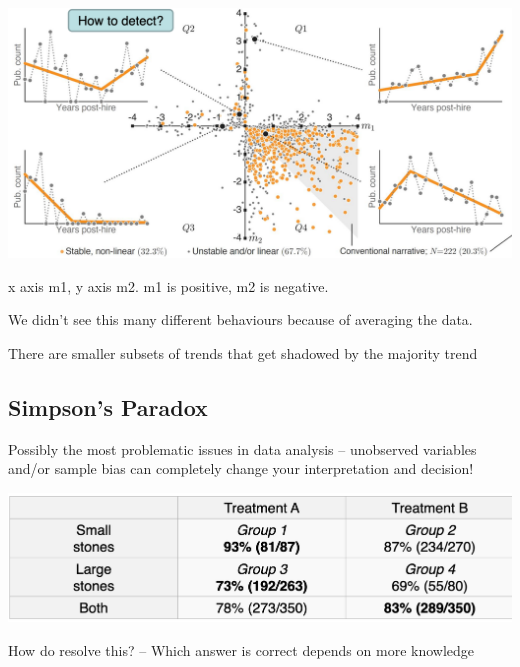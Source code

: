 \documentclass[11pt]{article}
\theoremstyle{definition}
\begin{document}
\includegraphics[width=\textwidth]{31.png}

x axis m1, y axis m2.
m1 is positive, m2 is negative.

We didn't see this many different behaviours because of averaging the data.

There are smaller subsets of trends that get shadowed by the majority trend

\subsection{Simpson's Paradox}
Possibly the most problematic issues in data analysis –
unobserved variables and/or sample bias can completely
change your interpretation and decision!

\includegraphics[width=\textwidth]{32.png}

How do resolve this?
– Which answer is correct depends on more knowledge
\end{document}
